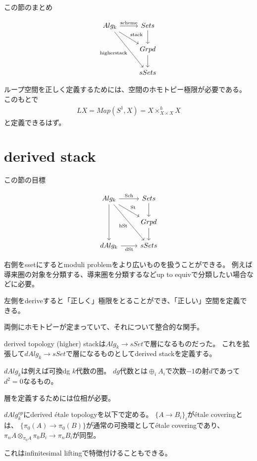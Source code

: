 \documentclass[dvipdfmx]{beamer}
\begin{document}
\begin{frame}[fragile]{この節のまとめ}

\[\begin{tikzcd}[column sep=small]
Alg_k \ar[rr, "\rm{scheme}"] \ar[rrd, "\rm{stack}"] \ar[rrdd, left, "\rm{higher stack}"']& & Sets \ar[d]\\
& & Grpd \ar[d]\\
& & sSets 
\end{tikzcd}\]

ループ空間を正しく定義するためには、空間のホモトピー極限が必要である。
このもとで
\begin{align*}
LX=Map(S^1,X)=X\times^h_{X\times X}X
\end{align*}
と定義できるはず。
\end{frame}

\section{derived stack}

\begin{frame}[fragile]{この節の目標}

\[\begin{tikzcd}[column sep=small]
Alg_k \ar[dd] \ar[rr, "\rm{Sch}"] \ar[rrd, "\rm{St}"] \ar[rrdd, left, "\rm{hSt}"']& & Sets \ar[d]\\
& & Grpd \ar[d]\\
dAlg_k \ar[rr, "\rm{dSt}"']& & sSets 
\end{tikzcd}\]

右側をssetにするとmoduli problemをより広いものを扱うことができる。
例えば導来圏の対象を分類する、導来圏を分類するなどup to equivで分類したい場合などに必要。

左側をderiveすると「正しく」極限をとることができ、「正しい」空間を定義できる。

両側にホモトピーが定まっていて、それについて整合的な関手。
\end{frame}

\begin{frame}{derived topology}
(higher) stackは$Alg_k \to sSet$で層になるものだった。
これを拡張して$dAlg_k \to sSet$で層になるものとしてderived stackを定義する。

$dAlg_k$は例えば可換dg $k$代数の圏。
$dg$代数とは$\oplus_iA_i$で次数$-1$の射$d$であって$d^2=0$なるもの。

層を定義するためには位相が必要。
\begin{dfn}
$dAlg_k^{op}$にderived \'etale topologyを以下で定める。
$\{A \to B_i\}_i$が\'etale coveringとは、
$\{\pi_0(A) \to \pi_0(B)\}$が通常の可換環として\'etale coveringであり、$\pi_nA \otimes_{\pi_0A}\pi_0B_i \to \pi_nB_i$が同型。
\end{dfn}

これはinfinitesimal liftingで特徴付けることもできる。
\end{frame}
\end{document}
